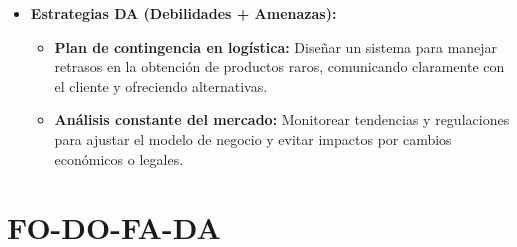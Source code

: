 \documentclass[12pt]{article}
\begin{document}
\begin{itemize}
\begin{itemize}
	\end{itemize}

	\item \textbf{Estrategias DA (Debilidades + Amenazas):}

	\begin{itemize}
		\item \textbf{Plan de contingencia en logística:} Diseñar un sistema para manejar retrasos en la obtención de productos raros, comunicando claramente con el cliente y ofreciendo alternativas.
		
		\item \textbf{Análisis constante del mercado:} Monitorear tendencias y regulaciones para ajustar el modelo de negocio y evitar impactos por cambios económicos o legales.

	\end{itemize}

\end{itemize}

\section*{FO-DO-FA-DA}
\end{document}
